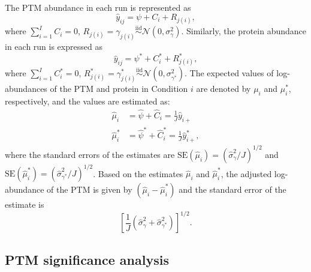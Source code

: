 \documentclass{mcp}
\begin{document}
The PTM abundance in each run is represented as 
\[
\hat{y}_{ij} = \psi + C_{i} + R_{j(i)},
\]
where $\sum_{i=1}^{I} C_{i} = 0$, $R_{j(i)} = \gamma_{j(i)} \stackrel{\text{iid}}{\sim} \mathcal{N}(0, \sigma_{\gamma}^{2})$. 
Similarly, the protein abundance in each run is expressed as
\[
\hat{y}_{ij} = \psi^{\ast} + C_{i}^{\ast} + R_{j(i)}^{\ast},
\]
where $\sum_{i=1}^{I} C_{i}^{\ast} = 0$, $R_{j(i)}^{\ast} = \gamma_{j(i)}^{\ast} \stackrel{\text{iid}}{\sim} \mathcal{N}(0, \sigma_{\gamma^{\ast}}^{2})$. The expected values of log-abundances of the PTM and protein in Condition $i$ are denoted by $\mu_{i}$ and $\mu_{i}^{\ast}$, respectively, and the values are estimated as: 
\begin{align*}
\hat{\mu}_{i} &= \hat{\psi} + \hat{C}_{i} = \frac{1}{J} \hat{y}_{i+} \\
\hat{\mu}_{i}^{\ast} &= \hat{\psi}^{\ast} + \hat{C}_{i}^{\ast} = \frac{1}{J} \hat{y}_{i+}^{\ast},
\end{align*}
where the standard errors of the estimates are $\mathrm{SE}(\hat{\mu}_{i}) = (\hat{\sigma}_{\gamma}^{2} / J)^{1/2}$ and $\mathrm{SE}(\hat{\mu}_{i}^{\ast}) = (\hat{\sigma}_{\gamma^{\ast}}^{2} / J)^{1/2}$.
Based on the estimates $\hat{\mu}_{i}$ and $\hat{\mu}_{i}^{\ast}$, the adjusted log-abundance of the PTM is given by $(\hat{\mu}_{i} - \hat{\mu}_{i}^{\ast})$ and the standard error of the estimate is 
\[
\left[ \frac{1}{J} \left( \hat{\sigma}_{\gamma}^{2} + \hat{\sigma}_{\gamma^{\ast}}^{2} \right) \right]^{1/2}.
\]


\subsection{PTM significance analysis}
\label{sec:test}
\end{document}

